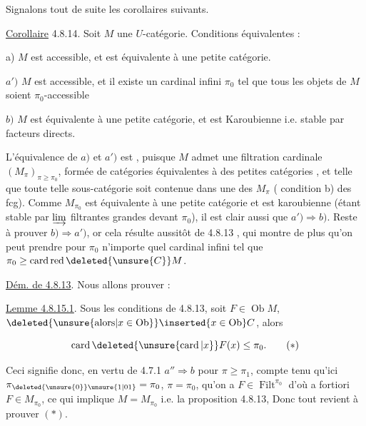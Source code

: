 Signalons tout de suite les corollaires suivants.

\uline{Corollaire} 4.8.14. Soit $M$ une $U$-catégorie. Conditions équivalentes :


a) $M$ est accessible, et est équivalente à une petite catégorie.

$a')$ $M$ est accessible, et il existe un cardinal infini $\pi_0$ tel que tous les objets de $M$ soient $\pi_0$-accessible \deleted{[De plus, si $\pi_0$ est \unsure{fi}} 

 $b)$ $M$ est équivalente à une petite catégorie, et est Karoubienne i.e. stable par facteurs directs.


L'équivalence de $a)$ et $a')$ est , puisque $M$ admet une filtration cardinale  $(M_{\pi})_{\pi\geq\pi_0}$, formée de  catégories équivalentes à des petites catégories , et telle que toute telle sous-catégorie soit contenue dans une des $M_{\pi}$ ( condition b) des fcg). Comme $M_{\pi_0}$ est équivalente à une petite catégorie et est karoubienne (étant stable par $\varinjlim$ filtrantes grandes devant $\pi_0$), il est clair aussi que $a')\Longrightarrow b)$. Reste à prouver $b)\Longrightarrow a')$, or  cela résulte aussitôt de 4.8.13 , qui montre de plus qu'on peut prendre pour $\pi_0$ n'importe quel cardinal infini tel que $\pi_0\geq\operatorname{card}\operatorname{red}\deleted{\unsure{C}} M$.

 \uline{Dém. de 4.8.13}. Nous allons  prouver :

\uline{Lemme 4.8.15.1}. Sous les conditions de 4.8.13, soit $F\in\operatorname{Ob}M$, $\deleted{\unsure{\text{alors}|x\in\operatorname{Ob}}}\inserted{x\in\operatorname{Ob}}C$, alors

\[
\operatorname{card}\deleted{\unsure{\operatorname{card}|x}}F(x)\leq\pi_0.\tag*{($\ast$)}
\]

Ceci signifie donc, en vertu de 4.7.1 $a''\Longrightarrow b$ pour $\pi\geq\pi_1$, compte tenu qu'ici $\pi_{\deleted{\unsure{0}}\unsure{1|01}}=\pi_0$, $\pi=\pi_0$, qu'on a $F\in\operatorname{Filt}^{\pi_0}$ d'où a fortiori $F\in M_{\pi_0}$, ce qui  implique $M=M_{\pi_0}$ i.e. la proposition 4.8.13,  Donc tout revient à prouver $(\ast)$.

